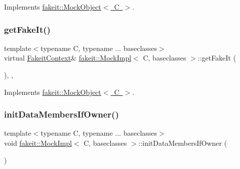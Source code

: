 Implements \mbox{\hyperlink{structfakeit_1_1MockObject_a26a2fa3fff133e8cb848b0757f58c6b6}{fakeit\+::\+Mock\+Object$<$ C $>$}}.

\mbox{\label{classfakeit_1_1MockImpl_a1b51dd1918a32ec5d450fc804ad37e63}} 
\subsubsection{\texorpdfstring{getFakeIt()}{getFakeIt()}\hspace{0.1cm}{\footnotesize\ttfamily [9/9]}}
{\footnotesize\ttfamily template$<$typename C, typename ... baseclasses$>$ \\
virtual \mbox{\hyperlink{structfakeit_1_1FakeitContext}{Fakeit\+Context}}\& \mbox{\hyperlink{classfakeit_1_1MockImpl}{fakeit\+::\+Mock\+Impl}}$<$ C, baseclasses $>$\+::get\+Fake\+It (\begin{DoxyParamCaption}{ }\end{DoxyParamCaption})\hspace{0.3cm}{\ttfamily [inline]}, {\ttfamily [override]}, {\ttfamily [virtual]}}



Implements \mbox{\hyperlink{structfakeit_1_1MockObject_a26a2fa3fff133e8cb848b0757f58c6b6}{fakeit\+::\+Mock\+Object$<$ C $>$}}.

\mbox{\label{classfakeit_1_1MockImpl_ad403c33f4734e31196ead952fc4c4805}} 
\subsubsection{\texorpdfstring{initDataMembersIfOwner()}{initDataMembersIfOwner()}\hspace{0.1cm}{\footnotesize\ttfamily [1/9]}}
{\footnotesize\ttfamily template$<$typename C, typename ... baseclasses$>$ \\
void \mbox{\hyperlink{classfakeit_1_1MockImpl}{fakeit\+::\+Mock\+Impl}}$<$ C, baseclasses $>$\+::init\+Data\+Members\+If\+Owner (\begin{DoxyParamCaption}{ }\end{DoxyParamCaption})\hspace{0.3cm}{\ttfamily [inline]}}

